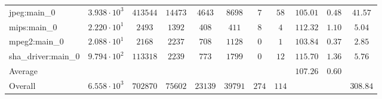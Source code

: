 \begin{tabular}{|l|c|c|c|c|c|c|c|c|c|c|}
jpeg:main\_0            & $ 3.938 \cdot 10^{3}  $ & $ 413544 $ & $ 14473 $ & $ 4643  $ & $ 8698  $ & $ 7   $ & $ 58  $ & $ 105.01      $ & $ 0.48    $ & $ 41.57   $ \\
mips:main\_0            & $ 2.220 \cdot 10^{1}  $ & $ 2493   $ & $ 1392  $ & $ 408   $ & $ 411   $ & $ 8   $ & $ 4   $ & $ 112.32      $ & $ 1.10    $ & $ 5.04    $ \\
mpeg2:main\_0           & $ 2.088 \cdot 10^{1}  $ & $ 2168   $ & $ 2237  $ & $ 708   $ & $ 1128  $ & $ 0   $ & $ 1   $ & $ 103.84      $ & $ 0.37    $ & $ 2.85    $ \\
sha\_driver:main\_0     & $ 9.794 \cdot 10^{2}  $ & $ 113318 $ & $ 2239  $ & $ 773   $ & $ 1799  $ & $ 0   $ & $ 12  $ & $ 115.70      $ & $ 1.36    $ & $ 5.76    $ \\
\hline
Average                 & $                     $ & $        $ & $       $ & $       $ & $       $ & $     $ & $     $ & $ 107.26      $ & $ 0.60    $ & $         $ \\
\hline
Overall                 & $ 6.558 \cdot 10^{3}  $ & $ 702870 $ & $ 75602 $ & $ 23139 $ & $ 39791 $ & $ 274 $ & $ 114 $ & $             $ & $         $ & $ 308.84  $ \\
\hline
\end{tabular}
